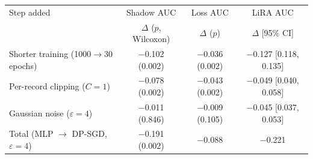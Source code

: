 \begin{tabular}{@{}lccc@{}}
\toprule
Step added & Shadow AUC & Loss AUC & LiRA AUC \\
 & {\scriptsize $\Delta$ ($p$, Wilcoxon)} & {\scriptsize $\Delta$ ($p$)} & {\scriptsize $\Delta$ [95\% CI]} \\
\midrule
Shorter training (1000$\to$30 epochs) & $-$0.102 (0.002) & $-$0.036 (0.002) & $-$0.127 {\scriptsize[0.118, 0.135]} \\
Per-record clipping ($C{=}1$) & $-$0.078 (0.002) & $-$0.043 (0.002) & $-$0.049 {\scriptsize[0.040, 0.058]} \\
Gaussian noise ($\varepsilon{=}4$) & $-$0.011 (0.846) & $-$0.009 (0.105) & $-$0.045 {\scriptsize[0.037, 0.053]} \\
\midrule
Total (MLP $\to$ DP-SGD, $\varepsilon{=}4$) & $-$0.191 (0.002) & $-$0.088 & $-$0.221 \\
\bottomrule
\end{tabular}

